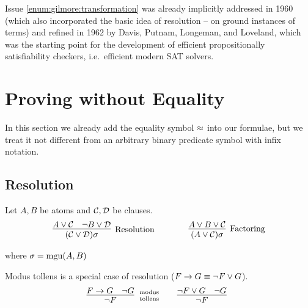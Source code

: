Issue \ref{enum:gilmore:transformation} was already implicitly
addressed in 1960 \cite{Davis:1960:CPQ:321033.321034}
(which also incorporated the basic idea of resolution -- on ground instances of terms)
and refined in 1962 \cite{Davis:1962:MPT:368273.368557}
by Davis, Putnam, Longeman, and Loveland,
which was the starting point for the development of efficient propositionally satisfiability checkers, i.e.~efficient modern SAT solvers.


\section{Proving without Equality}\label{sec:proving:without:equaltiy}

In this section we already add the equality symbol $\approx$ into our formulae,
but we treat it not different from an arbitrary binary predicate symbol with infix notation.

\subsection{Resolution}\label{sec:resolution}

\begin{definition}\label{def:resolution} Let $A, B$ be atoms and $\mathcal{C},\mathcal{D}$ be clauses.
	\begin{gather*}
	\infer
	[\text{Resolution}]
	{(\mcC\lor\mcD)\sigma}
	{A\lor\mcC&\lnot B\lor\mcD}
	\qquad\qquad
	\infer
	[\text{Factoring}]
	{(A\lor\mcC)\sigma}
	{A\lor B\lor\mcC}
	\end{gather*}
	\begin{center}
		where
		$\sigma=\operatorname{mgu}(A,B)$
	\end{center}
\end{definition}

\begin{example}Modus tollens is a special case of resolution ($F\rightarrow G\equiv \lnot F\lor G$).
	\begin{gather*}
	\infer[\text{modus}\atop\text{tollens}]{\lnot F}{F\limp G & \lnot G}
	\qquad
	\infer[]{\lnot F}{\lnot F\lor G & \lnot G}
	\end{gather*}
\end{example}


